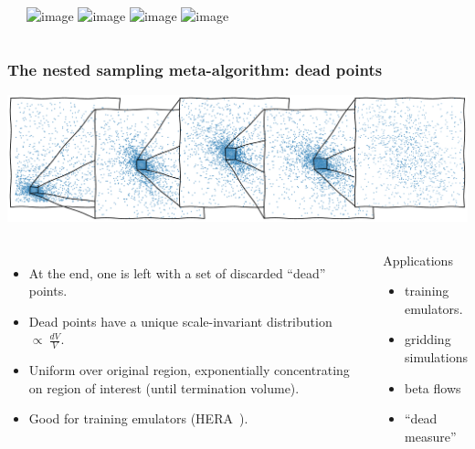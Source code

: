 \documentclass[aspectratio=169]{beamer}
\begin{document}
\begin{frame}
\begin{columns}
\begin{itemize}
        \end{itemize}
        \includegraphics<1|handout:0>[width=\textwidth,page=1]{figures/himmelblau}%
        \includegraphics<2|handout:0>[width=\textwidth,page=2]{figures/himmelblau}%
        \includegraphics<3|handout:0>[width=\textwidth,page=3]{figures/himmelblau}%
        \includegraphics<4-         >[width=\textwidth,page=4]{figures/himmelblau}%
    \end{columns}
\end{frame}

\begin{frame}
    \frametitle{The nested sampling meta-algorithm: dead points}
    \includegraphics[width=\textwidth]{figures/dead_measure}
    \begin{columns}
        \begin{itemize}
            \item At the end, one is left with a set of discarded ``dead'' points.
            \item Dead points have a unique scale-invariant distribution $\propto\: \tfrac{dV}{V}$.
            \item Uniform over original region, exponentially concentrating on region of interest (until termination volume).
            \item Good for training emulators (HERA~).
        \end{itemize}
        \begin{block}{Applications}
        \begin{itemize}
            \item training emulators.
            \item gridding simulations
            \item beta flows
            \item ``dead measure'' 
        \end{itemize}
        \end{block}
    \end{columns}
\end{frame}
\end{document}
